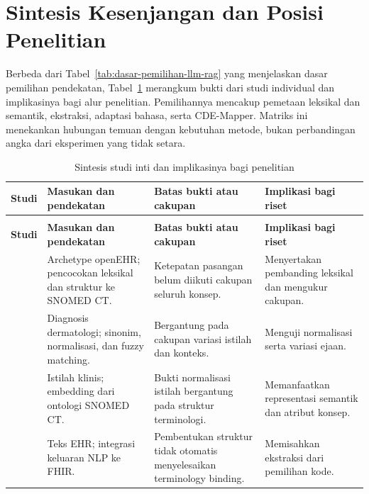\section{Sintesis Kesenjangan dan Posisi Penelitian}
\label{sec:sintesis-gap-penelitian}

Berbeda dari Tabel~\ref{tab:dasar-pemilihan-llm-rag} yang menjelaskan dasar pemilihan pendekatan, Tabel~\ref{tab:studi-inti-pemetaan} merangkum bukti dari studi individual dan implikasinya bagi alur penelitian. Pemilihannya mencakup pemetaan leksikal dan semantik, ekstraksi, adaptasi bahasa, serta CDE-Mapper. Matriks ini menekankan hubungan temuan dengan kebutuhan metode, bukan perbandingan angka dari eksperimen yang tidak setara.

\begingroup
\small
\setlength{\tabcolsep}{4pt}
\renewcommand{\arraystretch}{1.12}
\begin{longtable}{@{}>{\raggedright\arraybackslash}p{}>{\raggedright\arraybackslash}p{}>{\raggedright\arraybackslash}p{}>{\raggedright\arraybackslash}p{}@{}}
\caption{Sintesis studi inti dan implikasinya bagi penelitian}\label{tab:studi-inti-pemetaan}\\
\toprule
\textbf{Studi} & \textbf{Masukan dan pendekatan} & \textbf{Batas bukti atau cakupan} & \textbf{Implikasi bagi riset} \\
\midrule
\endfirsthead
\multicolumn{4}{l}{\textit{Tabel \thetable\ (lanjutan)}}\\
\toprule
\textbf{Studi} & \textbf{Masukan dan pendekatan} & \textbf{Batas bukti atau cakupan} & \textbf{Implikasi bagi riset} \\
\midrule
\endhead
\midrule
\endfoot
\bottomrule
\endlastfoot
\citet{meizoso_automated_2011} & Archetype openEHR; pencocokan leksikal dan struktur ke SNOMED CT. & Ketepatan pasangan belum diikuti cakupan seluruh konsep. & Menyertakan pembanding leksikal dan mengukur cakupan. \\
\midrule
\citet{sitaru_digitalising_2024} & Diagnosis dermatologi; sinonim, normalisasi, dan fuzzy matching. & Bergantung pada cakupan variasi istilah dan konteks. & Menguji normalisasi serta variasi ejaan. \\
\midrule
\citet{zahra_obtaining_2024} & Istilah klinis; embedding dari ontologi SNOMED CT. & Bukti normalisasi istilah bergantung pada struktur terminologi. & Memanfaatkan representasi semantik dan atribut konsep. \\
\midrule
\citet{hong_developing_2019} & Teks EHR; integrasi keluaran NLP ke FHIR. & Pembentukan struktur tidak otomatis menyelesaikan terminology binding. & Memisahkan ekstraksi dari pemilihan kode. \\

\end{longtable}
